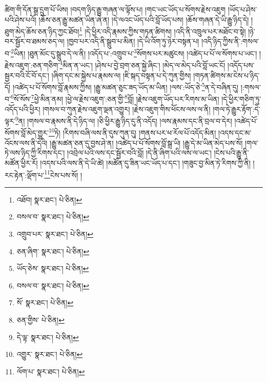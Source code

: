 ཚིག་གི་དོན་སྒྲ་དྲུག་པོ་ཡིས། །བདག་ཉིད་རྒྱུ་གཞན་ལ་ལྟོས་པ། །གང་ཡང་ཡོད་པ་སོགས་རྗེས་འཇུག །ཡོད་པ་ཤེས་པའི་ཤེས་པའོ། །ཆོས་ཅན་རྒྱུ་མཚན་ཡིན་ཞེ་ན། །དེ་ལའང་ཡོད་པའི་བློ་ཡོད་པས། །ཆོས་གཞན་དེ་ཡི་རྒྱུ་ཉིད་དེ། །ཐུག་མེད་ཆོས་ཅན་ཉིད་ཀྱང་ཐོབ།\footnote{འཐོབ།  སྣར་ཐང་།  པེ་ཅིན། } །དེ་ཕྱིར་འདི་རྣམས་ཀྱིས་གཏན་ཚིགས། །འདི་ནི་འཁྲུལ་པར་མཐོང་བ་སྟེ། །ཉེ་བར་སྦྱོར་བ་ཐམས་ཅད་ལ། །ཁྱབ་པར་འདི་ནི་སྒྲུབ་པ་མིན། །དེ་ཡི་འོག་ཏུ་ཉེར་བསྟན་པ། །འདི་ཉིད་ཀྱིས་ནི་:གསལ་བ་\footnote{བསལ་བ་  སྣར་ཐང་།  པེ་ཅིན། }ཡིན། །ཐུན་མོང་དུ་སྒྲུབ་དེ་ལ་ནི། །འདོད་པ་:འགྲུབ་པ་\footnote{འགྲུབ་པར་  སྣར་ཐང་།  པེ་ཅིན། }སོགས་པར་མཚུངས། །འཚེད་པ་པོ་ལ་སོགས་པ་ཡང་། །རྗེས་འཇུག་:ཅན་གཅིག་\footnote{ཅན་ཞིག་  སྣར་ཐང་།  པེ་ཅིན། }མིན་ན་ཡང་། །ཤེས་པ་བྱེ་བྲག་ཅན་སྐྱེ་ཞིང་། །མེད་ལ་མེད་པའི་བློ་ཡང་ངོ། །འདོད་པས་སྦྱར་བའི་ངོ་བོ་དང་། །ཞིག་དང་མ་སྐྱེས་པ་རྣམས་ལ། །ཇི་སྐད་བསྟན་པ་དེ་ཀུན་གྱིས། །གཏན་ཚིགས་མ་ངེས་པ་ཉིད་དོ། །འཚེད་པ་པོ་སོགས་བློ་རྣམས་ཀྱིས། །རྒྱུ་མཚན་ཅུང་ཟད་ཡོད་མ་ཡིན། །ལས་:ཡོད་ཅེ་\footnote{ཡོད་ཅེས་  སྣར་ཐང་།  པེ་ཅིན། }ན་དེ་བཞིན་དུ། །:གསལ་བ་\footnote{བསལ་བ་  སྣར་ཐང་།  པེ་ཅིན། }སོ་སོས་\footnote{སོ་  སྣར་ཐང་།  པེ་ཅིན། }ཕྱེ་མིན་ནམ། །ཕྱེ་ལ་རྗེས་འཇུག་:ཅན་གྱི་\footnote{ཅན་གྱིས་  པེ་ཅིན། }བློ། །རྗེས་འཇུག་ཡོད་པར་རིགས་མ་ཡིན། །དེ་ཕྱིར་གཅིག་ཏུ་འདོད་པའི་ཕྱིར། །གསལ་བ་ཀུན་རྗེས་འཇུག་ལྡན་འགྱུར། །རྗེས་འཇུག་གིས་ཕོངས་ལས་ལ་ནི། །གལ་ཏེ་རྒྱུར་རྟོག་:དེ་ལྟར་\footnote{དེ་ལྟ་  སྣར་ཐང་།  པེ་ཅིན། }ན། །གསལ་བ་རྣམས་ནི་དེ་ཉིད་ལ། །ཅི་ཕྱིར་རྒྱུ་ཉིད་དུ་ནི་འདོད། །ལས་རྣམས་དང་ནི་བྲལ་བ་དེར། །འཚེད་པོ་སོགས་བློ་མེད་གྱུར་\footnote{འགྱུར་  སྣར་ཐང་།  པེ་ཅིན། }ཏེ། །རིགས་བཞི་ལས་ནི་དུས་ཀུན་དུ། །གནས་པར་ཕ་རོལ་པོ་འདོད་མིན། །འདས་དང་མ་འོངས་ལས་ནི་དེའི། །རྒྱུ་མཚན་ཅན་དུ་བྱས་ཤེ་ན། །འཚེད་པ་པོ་སོགས་བློ་སྒྲ་ཡི། །རྒྱུ་དེ་མ་ཡིན་མེད་པས་སོ། །གལ་ཏེ་ལས་ཉིད་ཀྱི་རིགས་དང་། །འབྲེལ་པའི་ལས་དང་སྦྱོར་བའི་བློ། །དེ་ནི་ཞིག་པའི་ལས་ལ་ཡང་། །ངེས་པའི་རྒྱུ་ནི་མཚོན་ཕྱིར་རོ། །འདས་པའི་ལས་ནི་དེ་ཡི་ཚེ། །མཚོན་དུ་ཟིན་ཡང་ཡོད་པ་དང་། །གཟུང་བྱ་མིན་ཏེ་རིགས་ཀྱི་ནི། །རང་རྟེན་:ལྡོག་པ་\footnote{ལོག་པ་  སྣར་ཐང་།  པེ་ཅིན། }ངེས་པས་སོ། །
